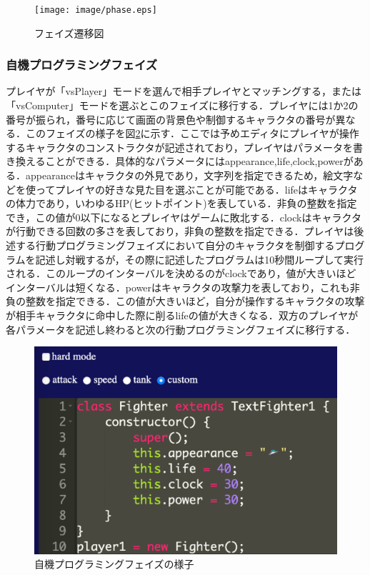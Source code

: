 \begin{figure}[!ht]
  \begin{center}
    \texttt{[image: image/phase.eps]}
  \end{center}
    \vspace{-8mm} 
  \caption{フェイズ遷移図}
  \label{phase}
\end{figure}

\subsubsection{自機プログラミングフェイズ}
プレイヤが「vsPlayer」モードを選んで相手プレイヤとマッチングする，または「vsComputer」モードを選ぶとこのフェイズに移行する．プレイヤには1か2の番号が振られ，番号に応じて画面の背景色や制御するキャラクタの番号が異なる．このフェイズの様子を図\ref{characterProgramming}に示す．ここでは予めエディタにプレイヤが操作するキャラクタのコンストラクタが記述されており，プレイヤはパラメータを書き換えることができる．具体的なパラメータにはappearance,life,clock,powerがある．appearanceはキャラクタの外見であり，文字列を指定できるため，絵文字などを使ってプレイヤの好きな見た目を選ぶことが可能である．lifeはキャラクタの体力であり，いわゆるHP(ヒットポイント)を表している．非負の整数を指定でき，この値が0以下になるとプレイヤはゲームに敗北する．clockはキャラクタが行動できる回数の多さを表しており，非負の整数を指定できる．プレイヤは後述する行動プログラミングフェイズにおいて自分のキャラクタを制御するプログラムを記述し対戦するが，その際に記述したプログラムは10秒間ループして実行される．このループのインターバルを決めるのがclockであり，値が大きいほどインターバルは短くなる．powerはキャラクタの攻撃力を表しており，これも非負の整数を指定できる．この値が大きいほど，自分が操作するキャラクタの攻撃が相手キャラクタに命中した際に削るlifeの値が大きくなる．双方のプレイヤが各パラメータを記述し終わると次の行動プログラミングフェイズに移行する．

\begin{figure}[!ht]
  \begin{center}
    \includegraphics[width=1.0\linewidth]{image/characterProgramming.eps}
  \end{center}
    \vspace{-8mm} 
  \caption{自機プログラミングフェイズの様子}
  \label{characterProgramming}
\end{figure}


